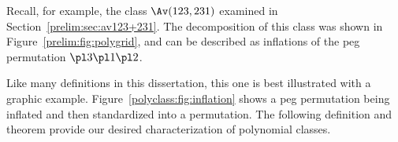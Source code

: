 \documentclass[12pt,twoside]{memoir}
\begin{document}
      
      Recall, for example, the class $\Av(123, 231)$ examined in
      Section~\ref{prelim:sec:av123+231}. The decomposition of this class was
      shown in Figure~\ref{prelim:fig:polygrid}, and can be described as
      inflations of the peg permutation $\pl 3 \pl 1 \pl 2$. 

      Like many definitions in this dissertation, this one is best illustrated with
      a graphic example. Figure~\ref{polyclass:fig:inflation} shows a peg
      permutation being inflated and then standardized into a permutation. The
      following definition and theorem provide our desired characterization of
      polynomial classes. 

      \begin{figure}[t] \centering






\end{figure}
\end{document}
